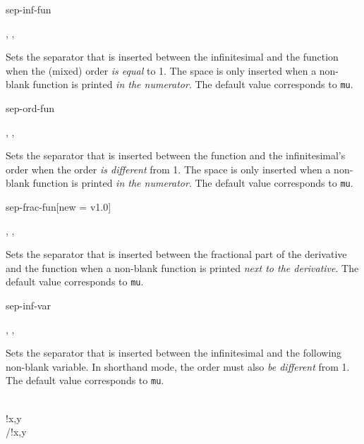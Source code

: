 \begin{option}{sep-inf-fun}
	\begin{values}[default = 0]
		, , 
	\end{values}
	Sets the separator that is inserted between the infinitesimal and the function when the (mixed) order \emph{is equal} to \num{1}. The space is only inserted when a non-blank function is printed \emph{in the numerator}. The default value corresponds to  \texttt{mu}.
	\begin{example}
	\end{example}
\end{option}

\begin{option}{sep-ord-fun}
	\begin{values}[default = 0]
		, , \marg{delimiter}
	\end{values}
	Sets the separator that is inserted between the function and the infinitesimal's order when the order \emph{is different} from \num{1}. The space is only inserted when a non-blank function is printed \emph{in the numerator}. The default value corresponds to  \texttt{mu}.
	\begin{example}
		\pdv[sep-ord-fun=\here]{f}{x,y}
	\end{example}
\end{option}

\begin{option}{sep-frac-fun}[new = v1.0]
	\begin{values}[default = 0]
		, , 
	\end{values}
	Sets the separator that is inserted between the fractional part of the derivative and the function when a non-blank function is printed \emph{next to the derivative}. The default value corresponds to  \texttt{mu}.
	\begin{example}
		\pdv*[sep-frac-fun=\here]{f}{x,y}
	\end{example}
\end{option}

\begin{option}{sep-inf-var}
	\begin{values}[default = 0]
		, , 
	\end{values}
	Sets the separator that is inserted between the infinitesimal and the following non-blank variable. In shorthand mode, the order must also \emph{be different} from \num{1}. The default value corresponds to  \texttt{mu}.
	\begin{example}
		\pdv[sep-inf-var=\here, order=2]{f}{x,y} \\
		!{x,y} \\
		/!{x,y}
	\end{example}
\end{option}

